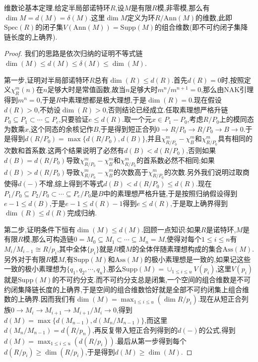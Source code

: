 维数论基本定理.给定半局部诺特环$R$,设$M$是有限$R$模,非零模,那么有$\dim M=d(M)=\delta(M)$.这里$\dim M$定义为环$R/\mathrm{Ann}(M)$的维数,此即$\mathrm{Spec}(R)$的闭子集$V(\mathrm{Ann}(M))=\mathrm{Supp}(M)$的组合维数(即不可约闭子集降链长度的上确界).
\begin{proof}
	
	我们的思路是依次归纳的证明不等式链$\dim(M)\le d(M)\le\delta(M)\le\dim(M)$.
	
	第一步,证明对半局部诺特环$R$总有$\dim(R)\le d(R)$.首先$d(R)=0$时,按照定义$\chi_R^m(n)$在$n$足够大时是常值函数,故当$n$足够大时$m^n/m^{n+1}=0$,那么由NAK引理得到$m^n=0$,于是$R$中素理想都是极大理想,于是$\dim(R)=0$.现在假设$d(R)>0$,不妨设$\dim(R)>0$,否则结论已经成立.任取素理想严格升链$P_0\subseteq P_1\subset\cdots\subseteq P_e$,只要验证$e\le d(R)$.取一个元$x\in P_1-P_0$,考虑$R/P_0$上的模同态为数乘$x$,这个同态的余核记作$B$,于是得到短正合列$0\to R/P_0\to R/P_0\to B\to0$.于是得到$d(R/P_0)=\max\{d(R/P_0),d(B)\}$,并且$\chi_{R/P_0}^m-\chi_B^m$和$\chi_{R/P_0}^m$具有相同的次数和首系数.这两个结果说明了必然有$d(B)<d(R/P_0)$,否则如果$d(B)=d(R/P_0)$导致$\chi_{R/P_0}^m-\chi_B^m$和$\chi_{R/P_0}^m$的首系数必然不相同;如果$d(B)>d(R/P_0)$导致$\chi_{R/P_0}^m-\chi_B^m$的次数高于$\chi_{R/P_0}^m$的次数.另外我们说明过取商使得$d(-)$不增,综上得到不等式$d(B)<d(R/P_0)\le d(R)$.现在$P_1/P_0\subseteq P_2/P_0\subset\cdots\subseteq P_e/P_0$是$B$中的素理想严格升链,于是按照归纳假设得到$e-1\le d(B)$,于是$e-1\le d(R)-1$得到$e\le d(R)$,于是取上确界得到$\dim(R)\le d(R)$完成归纳.
	
	第二步,证明条件下恒有$\dim(M)\le d(M)$.回顾一点知识:如果$R$是诺特环,$M$是有限$R$模,那么可构造链$0=M_0\subseteq M_1\subset\cdots\subseteq M_n=M$,使得对每个$1\le i\le n$有$M_i/M_{i-1}\cong R/p_i$,其中全体$\{p_i\}$就是$R$模$M$的全体伴随素理想构成的集合$\mathrm{Ass}(M)$.另外对于有限$R$模$M$,有$\mathrm{Supp}(M)$和$\mathrm{Ass}(M)$的极小素理想是一致的,如果记这些一致的极小素理想为$\{q_1,q_2,\cdots,q_u\}$,那么$\mathrm{Supp}(M)=\cup_{1\le i\le u}V(p_i)$,这里$V(p_i)$就是$\mathrm{Supp}(M)$的不可约分支.而不可约分支总是闭集,一个空间的组合维数是不可约闭集降链长度的上确界,于是空间的组合维数恰好就是全部不可约闭集上组合维数的上确界.因而我们有$\dim(M)=\max_{1\le i\le u}(\dim R/p_i)$.现在从短正合列族$0\to M_i\to M_{i+1}\to M_{i+1}/M_i\to0$,得到$d(M)=\max\{d(M_{n-1}),d(M_n/M_{n-1})\}$,而这里$d(M_n/M_{n-1})=d(R/p_n)$,再反复带入短正合列得到的$d(-)$的公式,得到$d(M)=\max_{1\le i\le u}(d(R/p_i))$.最后从第一步得到每个$d(R/p_i)\ge\dim(R/p_i)$,于是得到$d(M)\ge\dim(M)$.
	

\end{proof}
